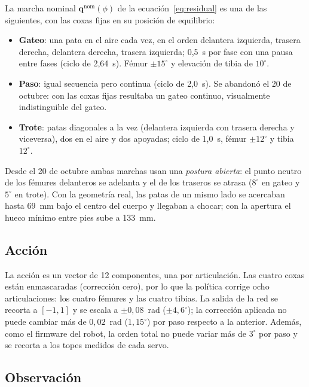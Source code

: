 La marcha nominal $\mathbf{q}^{\text{nom}}(\phi)$ de la ecuación~\eqref{eq:residual}
es una de las siguientes, con las coxas fijas en su posición de equilibrio:
\begin{itemize}
    \item \textbf{Gateo}: una pata en el aire cada vez, en el orden delantera
    izquierda, trasera derecha, delantera derecha, trasera izquierda;
    0,5~s por fase con una pausa entre fases (ciclo de 2,64~s). Fémur
    $\pm15^\circ$ y elevación de tibia de $10^\circ$.
    \item \textbf{Paso}: igual secuencia pero continua (ciclo de 2,0~s). Se
    abandonó el 20 de octubre: con las coxas fijas resultaba un gateo continuo,
    visualmente indistinguible del gateo.
    \item \textbf{Trote}: patas diagonales a la vez (delantera izquierda con
    trasera derecha y viceversa), dos en el aire y dos apoyadas; ciclo de
    1,0~s, fémur $\pm12^\circ$ y tibia $12^\circ$.
\end{itemize}
Desde el 20 de octubre ambas marchas usan una \emph{postura abierta}: el punto
neutro de los fémures delanteros se adelanta y el de los traseros se atrasa
($8^\circ$ en gateo y $5^\circ$ en trote). Con la geometría real, las patas de
un mismo lado se acercaban hasta 69~mm bajo el centro del cuerpo y llegaban a
chocar; con la apertura el hueco mínimo entre pies sube a 133~mm.

\subsection{Acción}

La acción es un vector de 12 componentes, una por articulación. Las cuatro
coxas están enmascaradas (corrección cero), por lo que la política corrige
ocho articulaciones: los cuatro fémures y las cuatro tibias. La salida de la
red se recorta a $[-1,1]$ y se escala a $\pm0{,}08$~rad ($\pm4{,}6^\circ$); la
corrección aplicada no puede cambiar más de $0{,}02$~rad ($1{,}15^\circ$) por
paso respecto a la anterior. Además, como el firmware del robot, la orden total
no puede variar más de $3^\circ$ por paso y se recorta a los topes medidos de
cada servo.

\subsection{Observación}

